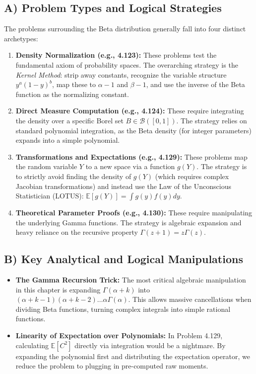 \documentclass[11pt, a4paper]{article}
\theoremstyle{definition}
\theoremstyle{remark}
\newcommand{\E}{\mathbb{E}}
\begin{document}
\subsection{A) Problem Types and Logical Strategies}
The problems surrounding the Beta distribution generally fall into four distinct archetypes:
\begin{enumerate}
    \item \textbf{Density Normalization (e.g., 4.123):} These problems test the fundamental axiom of probability spaces. The overarching strategy is the \textit{Kernel Method}: strip away constants, recognize the variable structure $y^{a}(1-y)^{b}$, map these to $\alpha-1$ and $\beta-1$, and use the inverse of the Beta function as the normalizing constant.
    \item \textbf{Direct Measure Computation (e.g., 4.124):} These require integrating the density over a specific Borel set $B \in \mathcal{B}([0,1])$. The strategy relies on standard polynomial integration, as the Beta density (for integer parameters) expands into a simple polynomial.
    \item \textbf{Transformations and Expectations (e.g., 4.129):} These problems map the random variable $Y$ to a new space via a function $g(Y)$. The strategy is to strictly avoid finding the density of $g(Y)$ (which requires complex Jacobian transformations) and instead use the Law of the Unconscious Statistician (LOTUS): $\E[g(Y)] = \int g(y)f(y)dy$.
    \item \textbf{Theoretical Parameter Proofs (e.g., 4.130):} These require manipulating the underlying Gamma functions. The strategy is algebraic expansion and heavy reliance on the recursive property $\Gamma(z+1) = z\Gamma(z)$.
\end{enumerate}

\subsection{B) Key Analytical and Logical Manipulations}
\begin{itemize}
    \item \textbf{The Gamma Recursion Trick:} The most critical algebraic manipulation in this chapter is expanding $\Gamma(\alpha+k)$ into $(\alpha+k-1)(\alpha+k-2)\dots\alpha\Gamma(\alpha)$. This allows massive cancellations when dividing Beta functions, turning complex integrals into simple rational functions.
    \item \textbf{Linearity of Expectation over Polynomials:} In Problem 4.129, calculating $\E[C^2]$ directly via integration would be a nightmare. By expanding the polynomial first and distributing the expectation operator, we reduce the problem to plugging in pre-computed raw moments.
\end{itemize}
\end{document}

